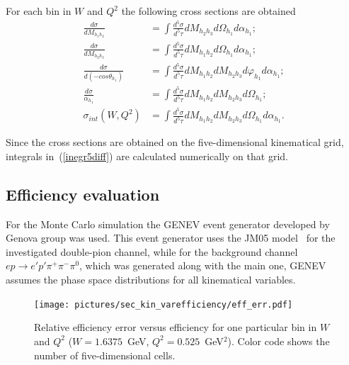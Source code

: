 \documentclass[prc,twocolumn,superscriptaddress,showpacs,amssymb,amsmath,amsfonts,linenumbers,aps]{revtex4-1}
\begin{document}
For each bin in $W$ and $Q^2$ the following cross sections are obtained
\begin{equation}
\begin{aligned}
\frac{d\sigma}{dM_{h_{1}h_{2}}} & =
\int\frac{d^{5}\sigma}{d^{5}\tau}dM_{h_{2}h_{3}}d\Omega_{h_{1}}d\alpha_{h_{1}};  \\
\frac{d\sigma}{dM_{h_{2}h_{3}}} & =
\int\frac{d^{5}\sigma}{d^{5}\tau}dM_{h_{1}h_{2}}d\Omega_{h_{1}}d\alpha_{h_{1}}; \\
\frac{d\sigma}{d(-cos\theta_{h_{1}})} & =
\int\frac{d^{5}\sigma}{d^{5}\tau}dM_{h_{1}h_{2}}dM_{h_{2}h_{3}}d\varphi_{h_{1}}d\alpha_{h_{1}};  \\
\frac{d\sigma}{\alpha_{h_{1}}} & =
\int\frac{d^{5}\sigma}{d^{5}\tau} dM_{h_{1}h_{2}}dM_{h_{2}h_{3}}d\Omega_{h_{1}}; \\
\sigma_{int}(W,Q^{2}) & =
\int\frac{d^{5}\sigma}{d^{5}\tau}dM_{h_{1}h_{2}}dM_{h_{2}h_{3}}d\Omega_{h_{1}}d\alpha_{h_{1}}.
\end{aligned}
\label{inegr5diff}
\end{equation}

Since the cross sections are obtained on the
five-dimensional kinematical grid,
integrals in~(\ref{inegr5diff}) are calculated numerically 
on that grid. 








\subsection{Efficiency evaluation}
\label{eff_err}

For the Monte Carlo simulation the GENEV event generator developed by 
Genova group was used. This event generator uses the JM05 model~\cite{JM05} for the investigated double-pion channel,
while for the background channel $e p \rightarrow e'p'\pi^{+}\pi^{-}\pi^{0}$, which was generated along with the main one, GENEV assumes the phase space distributions for all kinematical variables.



\begin{figure}[htp]
\begin{center}
\texttt{[image: pictures/sec\_kin\_varefficiency/eff\_err.pdf]}
\caption{\small Relative efficiency error versus efficiency for one particular bin in $W$ and $Q^2$ ($W = 1.6375$~GeV, $Q^2 = 0.525$~GeV$^2$). Color code shows the number of five-dimensional cells.} \label{fig:eff_err}
\end{center}
\end{figure}
\end{document}
